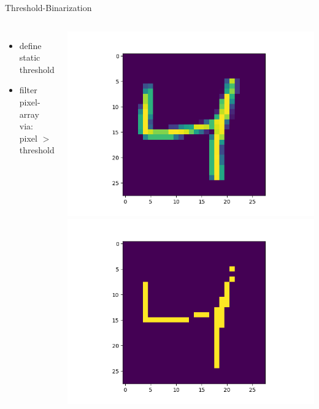 \documentclass[aspectratio=1610, 12pt]{beamer}
\begin{document}
\begin{frame}{Threshold-Binarization}
	\begin{columns}
		\begin{itemize}
			\item define static threshold
			\item filter pixel-array via: \\pixel $>$ threshold
		\end{itemize}
		\centering
  		\includegraphics[width=.6\linewidth]{./images/comparison/default}
  		\includegraphics[width=.6\linewidth]{./images/comparison/threshold/200}

	\end{columns}
\end{frame}
\end{document}
